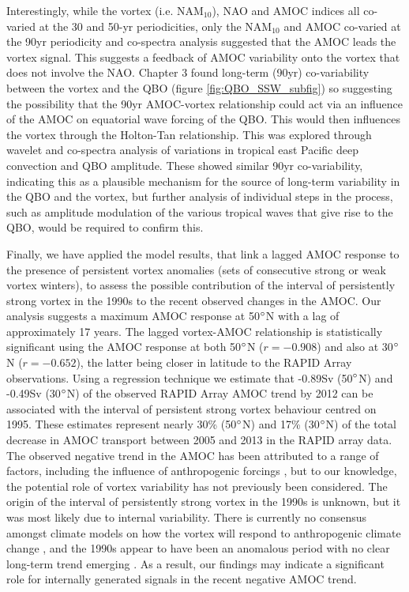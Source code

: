Interestingly, while the vortex (i.e. NAM$_{10}$), NAO and AMOC indices all co-varied at the 30 and 50-yr periodicities, only the NAM$_{10}$ and AMOC co-varied at the 90yr periodicity and co-spectra analysis suggested that the AMOC leads the vortex signal. This suggests a feedback of AMOC variability onto the vortex that does not involve the NAO. Chapter 3 found long-term (90yr) co-variability between the vortex and the QBO (figure \ref{fig:QBO_SSW_subfig}) so suggesting the possibility that the 90yr AMOC-vortex relationship could act via an influence of the AMOC on equatorial wave forcing of the QBO. This would then influences the vortex through the Holton-Tan relationship.  This was explored through wavelet and co-spectra analysis of variations in tropical east Pacific deep convection and QBO amplitude. These showed similar 90yr co-variability, indicating this as a plausible mechanism for the source of long-term variability in the QBO and the vortex, but further analysis of individual steps in the process, such as amplitude modulation of the various tropical waves that give rise to the QBO, would be required to confirm this.

Finally, we have applied the model results, that link a lagged AMOC response to the presence of persistent vortex anomalies (sets of consecutive strong or weak vortex winters), to assess the possible contribution  of the interval of persistently strong vortex in the 1990s to the recent observed changes in the AMOC. Our analysis suggests a maximum AMOC response at 50$\degree$N with a lag of approximately 17 years. The lagged vortex-AMOC relationship is statistically significant using the AMOC response at both 50$\degree$N ($r = -0.908$) and also at 30$\degree$N ($r = -0.652$), the latter being closer in latitude to the RAPID Array observations. Using a regression technique we estimate that -0.89Sv (50$\degree$N) and -0.49Sv (30$\degree$N) of the observed RAPID Array AMOC trend by 2012 can be associated with the interval of persistent strong vortex behaviour centred on 1995. These estimates represent nearly 30\% (50$\degree$N) and 17\% (30$\degree$N) of the total decrease in AMOC transport between 2005 and 2013 in the RAPID array data. The observed negative trend in the AMOC has been attributed to a range of factors, including the influence of anthropogenic forcings \citep{caesarObserved2018, caesarCurrent2021}, but to our knowledge, the potential role of vortex variability has not previously been considered. The origin of the interval of persistently strong vortex in the 1990s is unknown, but it was most likely due to internal variability. There is currently no consensus amongst climate models on how the vortex will respond to anthropogenic climate change \citep{ayarzaguenaUncertainty2020b}, and the 1990s appear to have been an anomalous period with no clear long-term trend emerging \citep{domeisenEstimating2019d}. As a result, our findings may indicate a significant role for internally generated signals in the recent negative AMOC trend. 

